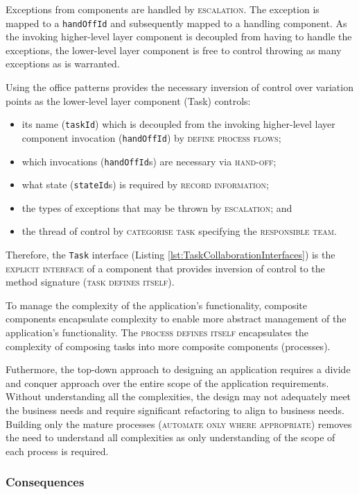 \documentclass[prodmode]{style/acmlarge}
\begin{document}
Exceptions from components are handled by \textsc{escalation}.  The
exception is mapped to a \texttt{handOffId} and subsequently mapped to a
handling component.  As the invoking higher-level layer component is decoupled
from having to handle the exceptions, the lower-level layer component is free to
control throwing as many exceptions as is warranted.

Using the office patterns provides the necessary inversion of control over
variation points as the lower-level layer component (Task) controls:
\begin{itemize}
  \item its name (\texttt{taskId}) which is decoupled from the invoking higher-level layer component invocation (\texttt{handOffId}) by \textsc{define process flows};
  \item which invocations (\texttt{handOffId}s) are necessary via \textsc{hand-off};
  \item what state (\texttt{stateId}s) is required by \textsc{record information};
  \item the types of exceptions that may be thrown by \textsc{escalation}; and
  \item the thread of control by \textsc{categorise task} specifying the \textsc{responsible team}.
\end{itemize}

Therefore, the \texttt{Task} interface (Listing
\ref{lst:TaskCollaborationInterfaces}) is the \textsc{explicit interface} of a
component that provides inversion of control to the method signature
(\textsc{task defines itself}).

To manage the complexity of the application's functionality, composite
components encapsulate complexity to enable more abstract management of the
application's functionality.  The \textsc{process defines itself} encapsulates
the complexity of composing tasks into more composite components (processes).

Futhermore, the top-down approach to designing an application requires a divide
and conquer approach over the entire scope of the application requirements.
Without understanding all the complexities, the design may not adequately meet
the business needs and require significant refactoring to align to business
needs.  Building only the mature processes (\textsc{automate only where
appropriate}) removes the need to understand all complexities as only
understanding of the scope of each process is required.


\subsubsection*{Consequences}
\end{document}
